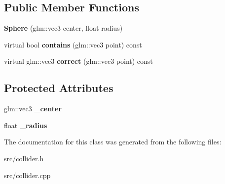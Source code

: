 \subsection*{Public Member Functions}
\begin{DoxyCompactItemize}
\item 
\hypertarget{class_sphere_a170af08dfd10bbafc0c3ec6fa693743e}{}{\bfseries Sphere} (glm\+::vec3 center, float radius)\label{class_sphere_a170af08dfd10bbafc0c3ec6fa693743e}

\item 
\hypertarget{class_sphere_a90f393174b2bb89987a35bf6144f93fe}{}virtual bool {\bfseries contains} (glm\+::vec3 point) const \label{class_sphere_a90f393174b2bb89987a35bf6144f93fe}

\item 
\hypertarget{class_sphere_aa451d786b6e46238c53bdc2a6799a10e}{}virtual glm\+::vec3 {\bfseries correct} (glm\+::vec3 point) const \label{class_sphere_aa451d786b6e46238c53bdc2a6799a10e}

\end{DoxyCompactItemize}
\subsection*{Protected Attributes}
\begin{DoxyCompactItemize}
\item 
\hypertarget{class_sphere_a8e01c6c14ad13dd80219430730ddac41}{}glm\+::vec3 {\bfseries \+\_\+center}\label{class_sphere_a8e01c6c14ad13dd80219430730ddac41}

\item 
\hypertarget{class_sphere_a73ecfaa359b78657c92cc04a5f2bb5fd}{}float {\bfseries \+\_\+radius}\label{class_sphere_a73ecfaa359b78657c92cc04a5f2bb5fd}

\end{DoxyCompactItemize}


The documentation for this class was generated from the following files\+:\begin{DoxyCompactItemize}
\item 
src/collider.\+h\item 
src/collider.\+cpp\end{DoxyCompactItemize}
